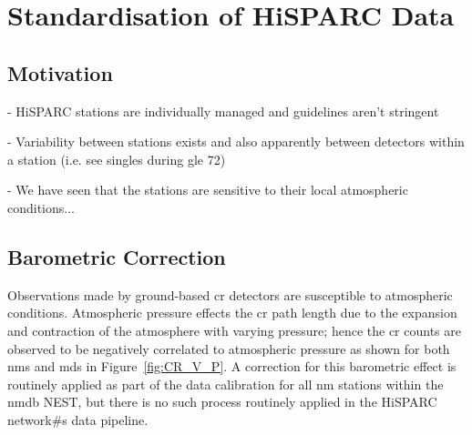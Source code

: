 \section{Standardisation of HiSPARC Data}\label{sec:HS_standardisation}

\subsection{Motivation}
- HiSPARC stations are individually managed and guidelines aren't stringent

- Variability between stations exists and also apparently between detectors within a station (i.e. see singles during \gls{gle} 72)

- We have seen that the stations are sensitive to their local atmospheric conditions...

\subsection{Barometric Correction}\label{sec:HS_P_corr}

Observations made by ground-based \gls{cr} detectors are susceptible to atmospheric conditions. Atmospheric pressure effects the \gls{cr} path length due to the expansion and contraction of the atmosphere with varying pressure; hence the \gls{cr} counts are observed to be negatively correlated to atmospheric pressure as shown for both \glspl{nm} and \glspl{md} in Figure~\ref{fig:CR_V_P}. A correction for this barometric effect is routinely applied as part of the data calibration for all \gls{nm} stations within the \gls{nmdb} NEST, but there is no such process routinely applied in the HiSPARC network#s data pipeline.


